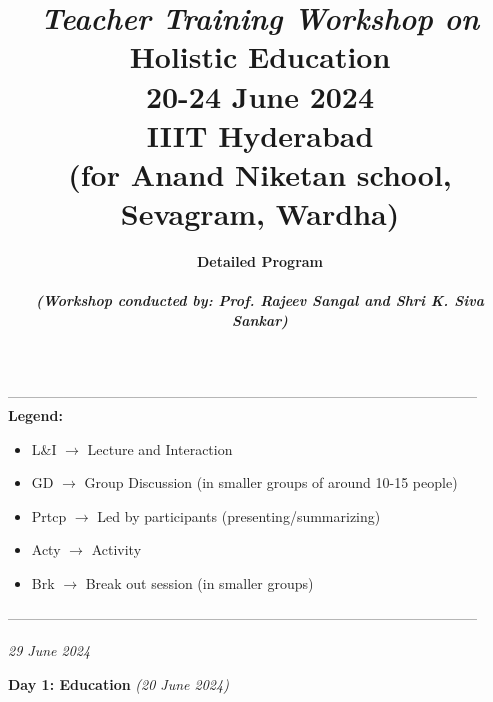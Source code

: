 \documentclass[11pt]{article}
\title{ {\Large\em Teacher Training Workshop on} \\
{\bf Holistic Education}\\
{\Large 20-24 June 2024}\\
{\Large IIIT Hyderabad\\
(for Anand Niketan school, Sevagram, Wardha)} }
\author{\LARGE\bf Detailed Program\\
~\\
{\em (Workshop conducted by: Prof. Rajeev Sangal and Shri K. Siva Sankar)}
}
\date{}
\begin{document}
    \maketitle


    \vspace{12mm}
    \noindent
    -----------------------------------------------------------------------------------------------------\\
    \noindent
    {\bf Legend:}
    \begin{itemize}
        \item L\&I  $\rightarrow$ Lecture and Interaction
        \item GD $\rightarrow$ Group Discussion (in smaller groups of around 10-15 people)
        \item Prtcp $\rightarrow$ Led by participants (presenting/summarizing)
        \item Acty  $\rightarrow$ Activity
        \item Brk   $\rightarrow$ Break out session (in smaller groups)
    \end{itemize}
    -----------------------------------------------------------------------------------------------------\\

    \begin{flushright}
    {\it 29 June 2024}
        \\
    \end{flushright}


    \newpage
    \begin{center}
    {\LARGE {\bf Day 1: Education} {\em (20 June 2024)}}
        \\
    \end{center}
\end{document}
